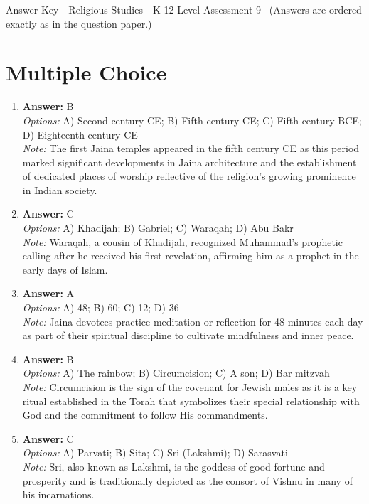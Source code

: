 \documentclass[12pt]{article}
\begin{document}
\begin{center}
Answer Key - Religious Studies - K-12 Level Assessment 9 \
\small (Answers are ordered exactly as in the question paper.)
\end{center}

\section*{Multiple Choice}
\begin{enumerate}[label=\arabic*.]
\item \textbf{Answer:} B
\\ \textit{Options:} A) Second century CE; B) Fifth century CE; C) Fifth century BCE; D) Eighteenth century CE
\\ \textit{Note:} The first Jaina temples appeared in the fifth century CE as this period marked significant developments in Jaina architecture and the establishment of dedicated places of worship reflective of the religion's growing prominence in Indian society.
\item \textbf{Answer:} C
\\ \textit{Options:} A) Khadijah; B) Gabriel; C) Waraqah; D) Abu Bakr
\\ \textit{Note:} Waraqah, a cousin of Khadijah, recognized Muhammad's prophetic calling after he received his first revelation, affirming him as a prophet in the early days of Islam.
\item \textbf{Answer:} A
\\ \textit{Options:} A) 48; B) 60; C) 12; D) 36
\\ \textit{Note:} Jaina devotees practice meditation or reflection for 48 minutes each day as part of their spiritual discipline to cultivate mindfulness and inner peace.
\item \textbf{Answer:} B
\\ \textit{Options:} A) The rainbow; B) Circumcision; C) A son; D) Bar mitzvah
\\ \textit{Note:} Circumcision is the sign of the covenant for Jewish males as it is a key ritual established in the Torah that symbolizes their special relationship with God and the commitment to follow His commandments.
\item \textbf{Answer:} C
\\ \textit{Options:} A) Parvati; B) Sita; C) Sri (Lakshmi); D) Sarasvati
\\ \textit{Note:} Sri, also known as Lakshmi, is the goddess of good fortune and prosperity and is traditionally depicted as the consort of Vishnu in many of his incarnations.
\end{enumerate}
\end{document}
